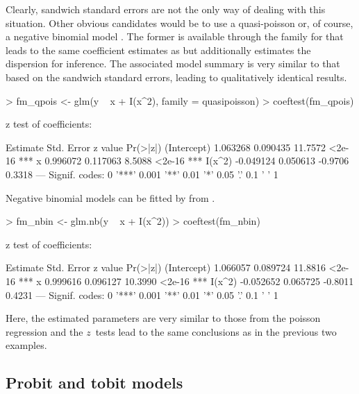 \documentclass{Z}
\begin{document}
Clearly, sandwich standard errors are not the only way of
dealing with this situation. Other obvious candidates would be to use a
quasi-poisson or, of course, a negative binomial model \citep{hac:McCullagh+Nelder:1989}.
The former is available through the  family for 
that leads to the same coefficient estimates as  but additionally
estimates the dispersion for inference. The associated model summary is very
similar to that based on the sandwich standard errors, leading to qualitatively
identical results.

\begin{Schunk}
\begin{Sinput}
> fm_qpois <- glm(y ~ x + I(x^2), family = quasipoisson)
> coeftest(fm_qpois)
\end{Sinput}
\begin{Soutput}
z test of coefficients:

             Estimate Std. Error z value Pr(>|z|)    
(Intercept)  1.063268   0.090435 11.7572   <2e-16 ***
x            0.996072   0.117063  8.5088   <2e-16 ***
I(x^2)      -0.049124   0.050613 -0.9706   0.3318    
---
Signif. codes:  0 '***' 0.001 '**' 0.01 '*' 0.05 '.' 0.1 ' ' 1 
\end{Soutput}
\end{Schunk}

Negative binomial models can be fitted by  from  
\citep{hac:Venables+Ripley:2002}.

\begin{Schunk}
\begin{Sinput}
> fm_nbin <- glm.nb(y ~ x + I(x^2))
> coeftest(fm_nbin)
\end{Sinput}
\begin{Soutput}
z test of coefficients:

             Estimate Std. Error z value Pr(>|z|)    
(Intercept)  1.066057   0.089724 11.8816   <2e-16 ***
x            0.999616   0.096127 10.3990   <2e-16 ***
I(x^2)      -0.052652   0.065725 -0.8011   0.4231    
---
Signif. codes:  0 '***' 0.001 '**' 0.01 '*' 0.05 '.' 0.1 ' ' 1 
\end{Soutput}
\end{Schunk}

Here, the estimated parameters are very similar to those from the poisson regression
and the $z$~tests lead to the same conclusions as in the previous two examples.


\subsection{Probit and tobit models}
\end{document}
